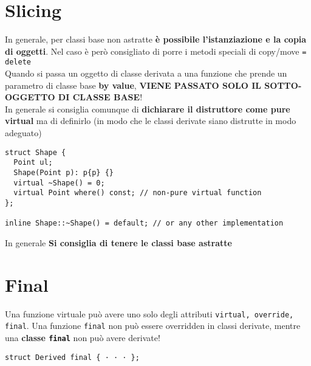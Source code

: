 \documentclass[10pt, oneside]{Book}
\begin{document}
\section{Slicing}
In generale, per classi base non astratte \textbf{è possibile l'istanziazione e la copia di oggetti}. Nel caso è però consigliato di porre i metodi speciali di copy/move \texttt{= delete}
\\Quando si passa un oggetto di classe derivata a una funzione che prende un parametro di classe base \textbf{by value}, \textbf{VIENE PASSATO SOLO IL SOTTO-OGGETTO DI CLASSE BASE}!
\\In generale si consiglia comunque di \textbf{dichiarare il distruttore come pure virtual} ma di definirlo (in modo che le classi derivate siano distrutte in modo adeguato)
\begin{verbatim}
struct Shape {
  Point ul;
  Shape(Point p): p{p} {}
  virtual ~Shape() = 0;
  virtual Point where() const; // non-pure virtual function
};

inline Shape::~Shape() = default; // or any other implementation
\end{verbatim}
In generale \textbf{Si consiglia di tenere le classi base astratte}

\section{Final}
Una funzione virtuale può avere uno solo degli attributi \texttt{virtual, override, final}. Una funzione \texttt{final} non può essere overridden in classi derivate, mentre una \textbf{classe \texttt{final}} non può avere derivate!
\begin{verbatim}
struct Derived final { · · · };
\end{verbatim}
\end{document}
